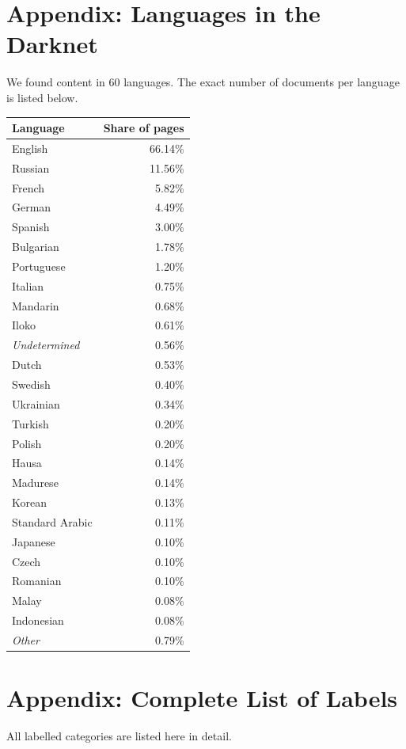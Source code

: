 \documentclass[USenglish,oneside,twocolumn]{article}
\begin{document}
\section{Appendix: Languages in the Darknet}
\label{appendix:B}
We found content in 60 languages. The exact number of documents per language is listed below.
\begin{center}
    \label{table:languages}
    \begin{supertabular}[H]{p{4cm} | r{3.5cm}}
    \textbf{Language} &	\textbf{Share of pages}	\\
    \hline 
    \hline
	English		&	66.14\%\\
	\hline
	Russian		&	11.56\%\\
	\hline
	French		&	5.82\%\\
	\hline
	German		&	4.49\%\\
	\hline
	Spanish		&	3.00\%\\
	\hline
	Bulgarian	&	1.78\%\\
	\hline
	Portuguese	&	1.20\%\\
	\hline
	Italian	&	0.75\%\\
	\hline
	Mandarin	&	0.68\%\\
	\hline
	Iloko		&	0.61\%\\
	\hline
	\textit{Undetermined}	&	0.56\%\\
	\hline
	Dutch		&	0.53\%\\
	\hline
	Swedish		&	0.40\%\\
	\hline
	Ukrainian	&	0.34\%\\
	\hline
	Turkish		&	0.20\%\\
	\hline
	Polish		&	0.20\%\\
	\hline
	Hausa		&	0.14\%\\
	\hline
	Madurese	&	0.14\%\\
	\hline
	Korean		&	0.13\%\\
	\hline
	Standard Arabic	&	0.11\%\\
	\hline
	Japanese	&	0.10\%\\
	\hline
	Czech		&	0.10\%\\
	\hline
	Romanian	&	0.10\%\\
	\hline
	Malay		&	0.08\%\\
	\hline
	Indonesian	&	0.08\%\\
	\hline
	\textit{Other}		&	0.79\%\\
    \end{supertabular}
\end{center}

\section{Appendix: Complete List of Labels}
All labelled categories are listed here in detail.
\end{document}
